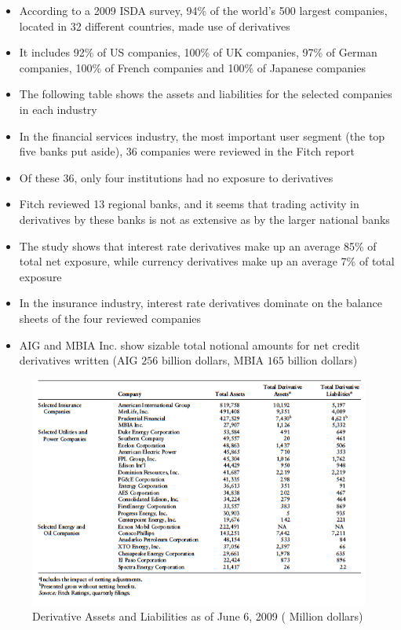 \documentclass[11pt]{beamer}
\begin{document}
\begin{frame}
\begin{itemize}
\item According to a 2009 ISDA survey, 94\% of the world’s 500 largest companies, located in 32 different countries, made use of derivatives
\item It includes 92\% of US companies, 100\% of UK companies, 97\% of German companies, 100\% of French companies and 100\% of Japanese companies
\item The following table shows the assets and liabilities for the selected companies in each industry
\item In the financial services industry, the most important user segment (the top five banks put aside), 36 companies were reviewed in the Fitch report
\item Of these 36, only four institutions had no exposure to derivatives
\end{itemize}
\end{frame}

\begin{frame}
\begin{itemize}
\item Fitch reviewed 13 regional banks, and it seems that trading activity in derivatives by these banks is not as extensive as by the larger national banks
\item The study shows that interest rate derivatives make up an average 85\% of total net exposure, while currency derivatives make up an average 7\% of total exposure
\item In the insurance industry, interest rate derivatives dominate on the balance sheets of the four reviewed companies
\item AIG and MBIA Inc. show sizable total notional amounts for net credit derivatives written (AIG $256$ billion dollars, MBIA $165$ billion dollars)
\end{itemize}
\end{frame}

\begin{frame}
\begin{figure}
\includegraphics[width=\textwidth]{13_6.png}
\caption{Derivative Assets and Liabilities as of June 6, 2009 ( Million dollars)}
\end{figure}
\end{frame}
\end{document}
